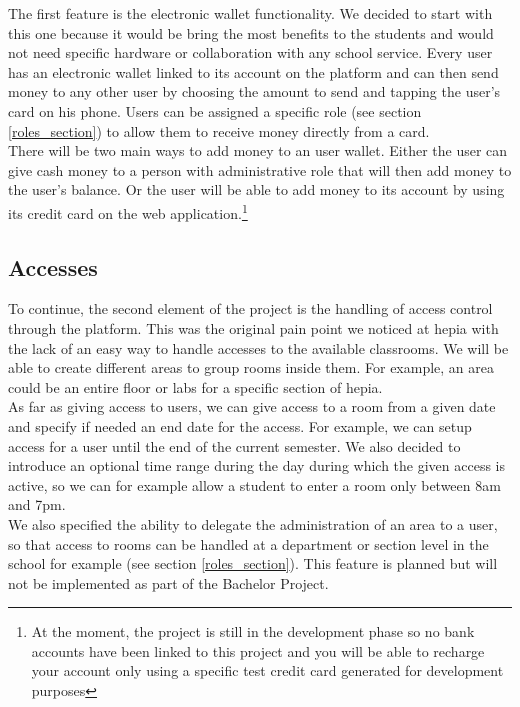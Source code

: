 \documentclass[11pt,a4paper]{report}
\begin{document}
The first feature is the electronic wallet functionality. We decided to start with this one because it would be bring the most benefits to the students and would not need specific hardware or collaboration with any school service. Every user has an electronic wallet linked to its account on the platform and can then send money to any other user by choosing the amount to send and tapping the user's card on his phone. Users can be assigned a specific role (see section \ref{roles_section}) to allow them to receive money directly from a card.\\

There will be two main ways to add money to an user wallet. Either the user can give cash money to a person with administrative role that will then add money to the user's balance. Or the user will be able to add money to its account by using its credit card on the web application.\footnote{At the moment, the project is still in the development phase so no bank accounts have been linked to this project and you will be able to recharge your account only using a specific test credit card generated for development purposes}

\subsection{Accesses}

To continue, the second element of the project is the handling of access control through the platform. This was the original pain point we noticed at hepia with the lack of an easy way to handle accesses to the available classrooms. We will be able to create different areas to group rooms inside them. For example, an area could be an entire floor or labs for a specific section of hepia.\\

As far as giving access to users, we can give access to a room from a given date and specify if needed an end date for the access. For example, we can setup access for a user until the end of the current semester. We also decided to introduce an optional time range during the day during which the given access is active, so we can for example allow a student to enter a room only between 8am and 7pm. \\

We also specified the ability to delegate the administration of an area to a user, so that access to rooms can be handled at a department or section level in the school for example (see section \ref{roles_section}). This feature is planned but will not be implemented as part of the Bachelor Project.
\end{document}
